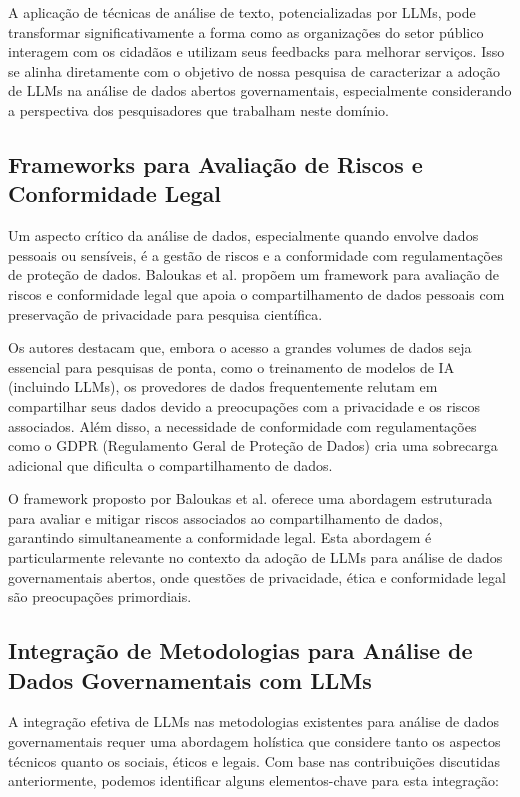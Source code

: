 A aplicação de técnicas de análise de texto, potencializadas por LLMs, pode transformar significativamente a forma como as organizações do setor público interagem com os cidadãos e utilizam seus feedbacks para melhorar serviços. Isso se alinha diretamente com o objetivo de nossa pesquisa de caracterizar a adoção de LLMs na análise de dados abertos governamentais, especialmente considerando a perspectiva dos pesquisadores que trabalham neste domínio.

\subsection{Frameworks para Avaliação de Riscos e Conformidade Legal}

Um aspecto crítico da análise de dados, especialmente quando envolve dados pessoais ou sensíveis, é a gestão de riscos e a conformidade com regulamentações de proteção de dados. Baloukas et al. \cite{Baloukas2024} propõem um framework para avaliação de riscos e conformidade legal que apoia o compartilhamento de dados pessoais com preservação de privacidade para pesquisa científica.

Os autores destacam que, embora o acesso a grandes volumes de dados seja essencial para pesquisas de ponta, como o treinamento de modelos de IA (incluindo LLMs), os provedores de dados frequentemente relutam em compartilhar seus dados devido a preocupações com a privacidade e os riscos associados. Além disso, a necessidade de conformidade com regulamentações como o GDPR (Regulamento Geral de Proteção de Dados) cria uma sobrecarga adicional que dificulta o compartilhamento de dados.

O framework proposto por Baloukas et al. \cite{Baloukas2024} oferece uma abordagem estruturada para avaliar e mitigar riscos associados ao compartilhamento de dados, garantindo simultaneamente a conformidade legal. Esta abordagem é particularmente relevante no contexto da adoção de LLMs para análise de dados governamentais abertos, onde questões de privacidade, ética e conformidade legal são preocupações primordiais.

\subsection{Integração de Metodologias para Análise de Dados Governamentais com LLMs}

A integração efetiva de LLMs nas metodologias existentes para análise de dados governamentais requer uma abordagem holística que considere tanto os aspectos técnicos quanto os sociais, éticos e legais. Com base nas contribuições discutidas anteriormente, podemos identificar alguns elementos-chave para esta integração:

